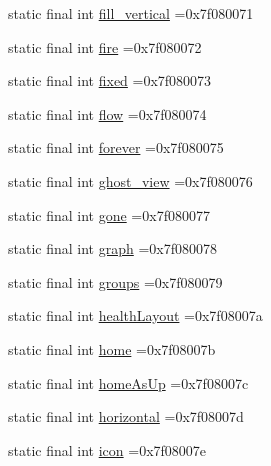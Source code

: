 \begin{DoxyCompactItemize}
\item 
static final int \mbox{\hyperlink{classcom_1_1example_1_1trainawearapplication_1_1_r_1_1id_aa682f7f463778120dc5785a6a4240bc0}{fill\+\_\+vertical}} =0x7f080071
\item 
static final int \mbox{\hyperlink{classcom_1_1example_1_1trainawearapplication_1_1_r_1_1id_aacc66d9a887e5f16a2fea988fe48b0e4}{fire}} =0x7f080072
\item 
static final int \mbox{\hyperlink{classcom_1_1example_1_1trainawearapplication_1_1_r_1_1id_a360e6173bdf8865acfd3abb036ea101c}{fixed}} =0x7f080073
\item 
static final int \mbox{\hyperlink{classcom_1_1example_1_1trainawearapplication_1_1_r_1_1id_a98028f28d2ae387817b156e884958662}{flow}} =0x7f080074
\item 
static final int \mbox{\hyperlink{classcom_1_1example_1_1trainawearapplication_1_1_r_1_1id_ab3a8a8bb997052077a8ffacb3087539e}{forever}} =0x7f080075
\item 
static final int \mbox{\hyperlink{classcom_1_1example_1_1trainawearapplication_1_1_r_1_1id_a989e8bdd7db628034b4750678466d77b}{ghost\+\_\+view}} =0x7f080076
\item 
static final int \mbox{\hyperlink{classcom_1_1example_1_1trainawearapplication_1_1_r_1_1id_ae01f33dfeade470958a23edbe6e6f82f}{gone}} =0x7f080077
\item 
static final int \mbox{\hyperlink{classcom_1_1example_1_1trainawearapplication_1_1_r_1_1id_a8fbc9a0c985bb3b79e3ce62a61b263b1}{graph}} =0x7f080078
\item 
static final int \mbox{\hyperlink{classcom_1_1example_1_1trainawearapplication_1_1_r_1_1id_ad59991baf024e260e2f3c9bcc2dcd79a}{groups}} =0x7f080079
\item 
static final int \mbox{\hyperlink{classcom_1_1example_1_1trainawearapplication_1_1_r_1_1id_ac7022725d1a1171b7cdc16f232b9bfc9}{health\+Layout}} =0x7f08007a
\item 
static final int \mbox{\hyperlink{classcom_1_1example_1_1trainawearapplication_1_1_r_1_1id_a5684d63ff5bab01365f176d68fedd96f}{home}} =0x7f08007b
\item 
static final int \mbox{\hyperlink{classcom_1_1example_1_1trainawearapplication_1_1_r_1_1id_acb29ee6fde4129f605fc1d716917b8ee}{home\+As\+Up}} =0x7f08007c
\item 
static final int \mbox{\hyperlink{classcom_1_1example_1_1trainawearapplication_1_1_r_1_1id_a27cc31ad74828c3a7b6be0cc6d47a7e6}{horizontal}} =0x7f08007d
\item 
static final int \mbox{\hyperlink{classcom_1_1example_1_1trainawearapplication_1_1_r_1_1id_aec4eb7f6b0d8cfb4974a1747d6d7cd8e}{icon}} =0x7f08007e

\end{DoxyCompactItemize}
